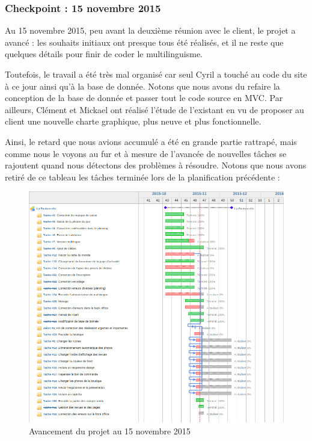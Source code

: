 \documentclass[11pt]{report}
\begin{document}
\subsubsection*{Checkpoint : 15 novembre 2015}
\par Au 15 novembre 2015, peu avant la deuxième réunion avec le client, le
projet a avancé : les souhaits initiaux ont presque tous été réalisés, et il ne 
reste que quelques détails pour finir de coder le multilinguisme. \\
\par Toutefois, le travail a été très mal organisé car seul Cyril a touché au
code du site à ce jour ainsi qu'à la base de donnée. Notons que nous avons du
refaire la conception de la base de donnée et passer tout le code source en 
MVC. 
Par
ailleurs, Clément et Mickael ont réalisé l'étude de l'existant en vu de proposer
au client une nouvelle charte graphique, plus neuve et plus fonctionnelle. \\
\par Ainsi, le retard que nous avions accumulé a été en grande partie rattrapé,
mais comme nous le voyons au fur et à mesure de l'avancée de nouvelles tâches se
rajoutent quand nous détectons des problèmes à résoudre. Notons que nous avons
retiré de ce tableau les tâches terminée lors de la planification précédente :

\begin{landscape}
\begin{figure}[t]
    \caption{Avancement du projet au 15 novembre 2015}
   \includegraphics[scale=0.5]{include/gantt15-11.png}
\end{figure}
\end{landscape}
\end{document}
